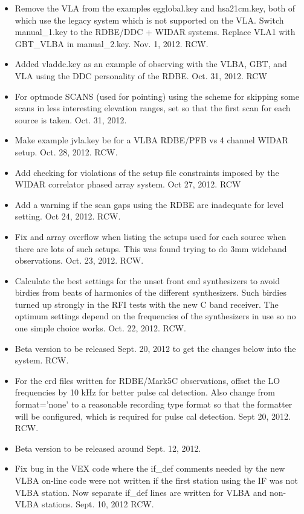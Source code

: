 \documentclass{report}
\begin{document}
\begin{itemize}
\item Remove the VLA from the examples egglobal.key and hsa21cm.key, both
of which use the legacy system which is not supported on the VLA.  Switch
manual\_1.key to the RDBE/DDC + WIDAR systems.  Replace VLA1 with GBT\_VLBA
in manual\_2.key.  Nov. 1, 2012.  RCW.

\item Added vladdc.key as an example of observing with the VLBA, GBT, 
and VLA using the DDC personality of the RDBE.  Oct. 31, 2012.  RCW

\item For optmode SCANS (used for pointing) using the scheme for 
skipping some scans in less interesting elevation ranges, set so 
that the first scan for each source is taken.  Oct. 31, 2012.

\item Make example jvla.key be for a VLBA RDBE/PFB vs 4 channel WIDAR setup.
Oct. 28, 2012.  RCW.

\item Add checking for violations of the setup file constraints imposed
by the WIDAR correlator phased array system.  Oct 27, 2012.  RCW

\item Add a warning if the scan gaps using the RDBE are inadequate for
level setting.  Oct 24, 2012.  RCW.

\item Fix and array overflow when listing the setups used for each source
when there are lots of such setups.  This was found trying to do 3mm 
wideband observations.  Oct. 23, 2012.  RCW.

\item Calculate the best settings for the unset front end synthesizers
to avoid birdies from beats of harmonics of the different synthesizers.
Such birdies turned up strongly in the RFI tests with the new C band
receiver.  The optimum settings depend on the frequencies of the
synthesizers in use so no one simple choice works.  Oct. 22, 2012.  RCW.

\item Beta version to be released Sept. 20, 2012 to get the changes
below into the system.  RCW.

\item For the crd files written for RDBE/Mark5C observations, offset
the LO frequencies by 10 kHz for better pulse cal detection.  Also
change from format='none' to a reasonable recording type format so
that the formatter will be configured, which is required for pulse
cal detection.  Sept 20, 2012.  RCW.

\item Beta version to be released around Sept. 12, 2012.

\item Fix bug in the VEX code where the if\_def comments needed by the
new VLBA on-line code were not written if the first station using the
IF was not VLBA station.  Now separate if\_def lines are written for
VLBA and non-VLBA stations.  Sept. 10, 2012  RCW.

\end{itemize}
\end{document}

